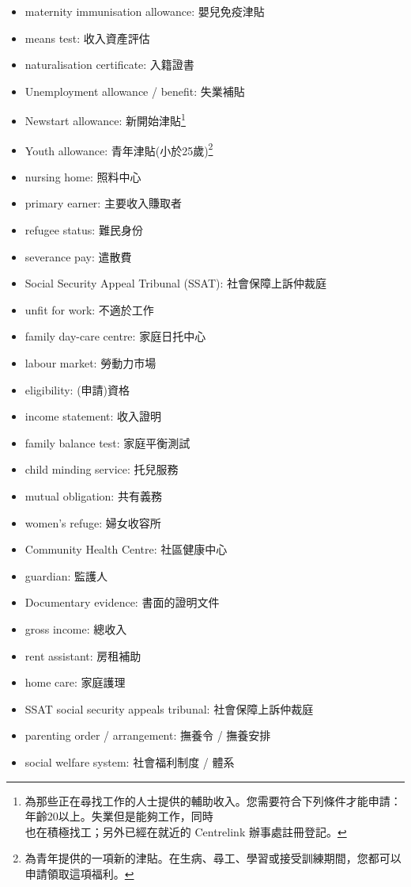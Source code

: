 \begin{multicols}{2}
\begin{itemize}
  \item maternity immunisation allowance: 嬰兒免疫津貼
  \item means test: 收入資產評估
  \item naturalisation certificate: 入籍證書
  \item Unemployment allowance / benefit: 失業補貼
  \item Newstart allowance: 新開始津貼\footnote{為那些正在尋找工作的人士提供的輔助收入。您需要符合下列條件才能申請：年齡20以上。失業但是能夠工作，同時\\也在積極找工；另外已經在就近的 Centrelink 辦事處註冊登記。}
  \item Youth allowance: 青年津貼(小於25歲)\footnote{為青年提供的一項新的津貼。在生病、尋工、學習或接受訓練期間，您都可以申請領取這項福利。}
  \item nursing home: 照料中心
  \item primary earner: 主要收入賺取者
  \item refugee status: 難民身份
  \item severance pay: 遣散費
  \item Social Security Appeal Tribunal (SSAT): 社會保障上訴仲裁庭
  \item unfit for work: 不適於工作
  \item family day-care centre: 家庭日托中心
  \item labour market: 勞動力市場
  \item eligibility: (申請)資格
  \item income statement: 收入證明
  \item family balance test: 家庭平衡測試
  \item child minding service: 托兒服務
  \item mutual obligation: 共有義務
  \item women's refuge: 婦女收容所
  \item Community Health Centre: 社區健康中心
  \item guardian: 監護人
  \item Documentary evidence: 書面的證明文件
  \item gross income: 總收入
  \item rent assistant: 房租補助
  \item home care: 家庭護理
  \item SSAT social security appeals tribunal: 社會保障上訴仲裁庭
  \item parenting order / arrangement: 撫養令 / 撫養安排
  \item social welfare system: 社會福利制度 / 體系

\end{itemize}
\end{multicols}

